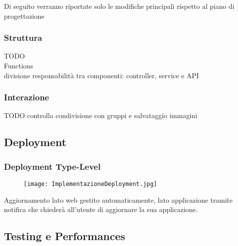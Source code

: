 Di seguito verranno riportate solo le modifiche principali rispetto al piano di progettazione
\subsubsection{Struttura}
TODO\\
Functions\\
divisione responsabilità tra componenti: controller, service e API\\
\subsubsection{Interazione}
TODO controlla condivisione con gruppi e salvataggio immagini
\newpage

\subsection{Deployment}

\subsubsection{Deployment Type-Level}

\begin{figure}[h!]
    \begin{center}
        \texttt{[image: ImplementazioneDeployment.jpg]}
    \end{center}
\end{figure}
Aggiornamento lato web gestito automaticamente, lato applicazione tramite notifica che chiederà all'utente di aggiornare la sua applicazione.
\newpage
\subsection{Testing e Performances}
